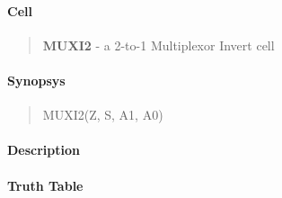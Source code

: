 \label{MUXI2}
\paragraph{Cell}
\begin{quote}
    \textbf{MUXI2} - a 2-to-1 Multiplexor Invert cell
\end{quote}

\paragraph{Synopsys}
\begin{quote}
    MUXI2(Z, S, A1, A0)
\end{quote}

\paragraph{Description}



\paragraph{Truth Table}


